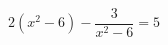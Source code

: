 \begin{ex}[type=equation]
	\begin{condition}
		$2\left(x^2 - 6\right) - \dfrac{3}{x^2 - 6} = 5$
	\end{condition}
\end{ex}